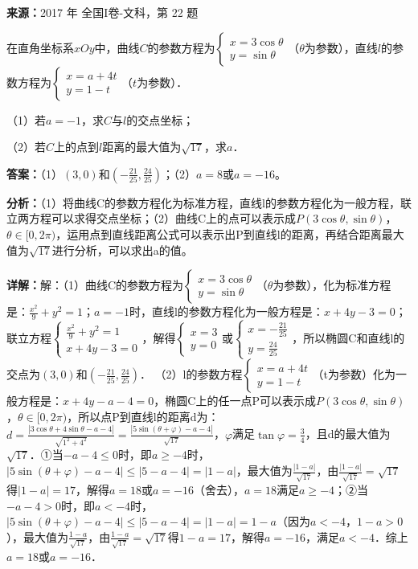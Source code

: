 \begin{question}[points=10]
\textbf{来源：}2017 年 全国I卷-文科，第 22 题\par
在直角坐标系$xOy$中，曲线$C$的参数方程为$\begin{cases} x=3\cos\theta \\ y=\sin\theta \end{cases}$（$\theta$为参数），直线$l$的参数方程为$\begin{cases} x=a+4t \\ y=1-t \end{cases}$（$t$为参数）．

（1）若$a=-1$，求$C$与$l$的交点坐标；

（2）若$C$上的点到$l$距离的最大值为$\sqrt{17}$，求$a$．
\begin{solution}
\textbf{答案：}（1）$(3,0)$和$(-\frac{21}{25},\frac{24}{25})$；（2）$a=8$或$a=-16$。

\textbf{分析：}（1）将曲线C的参数方程化为标准方程，直线l的参数方程化为一般方程，联立两方程可以求得交点坐标；（2）曲线C上的点可以表示成$P(3\cos\theta,\sin\theta)$，$\theta\in[0,2\pi)$，运用点到直线距离公式可以表示出P到直线l的距离，再结合距离最大值为$\sqrt{17}$进行分析，可以求出a的值。

\textbf{详解：}解：（1）曲线C的参数方程为$\begin{cases} x=3\cos\theta \\ y=\sin\theta \end{cases}$（$\theta$为参数），化为标准方程是：$\frac{x^2}{9}+y^2=1$；$a=-1$时，直线l的参数方程化为一般方程是：$x+4y-3=0$；联立方程$\begin{cases} \frac{x^2}{9}+y^2=1 \\ x+4y-3=0 \end{cases}$，解得$\begin{cases} x=3 \\ y=0 \end{cases}$或$\begin{cases} x=-\frac{21}{25} \\ y=\frac{24}{25} \end{cases}$，所以椭圆C和直线l的交点为$(3,0)$和$(-\frac{21}{25},\frac{24}{25})$．
（2）l的参数方程$\begin{cases} x=a+4t \\ y=1-t \end{cases}$（t为参数）化为一般方程是：$x+4y-a-4=0$，椭圆C上的任一点P可以表示成$P(3\cos\theta,\sin\theta)$，$\theta\in[0,2\pi)$，所以点P到直线l的距离d为：$d=\frac{|3\cos\theta+4\sin\theta-a-4|}{\sqrt{1^2+4^2}}=\frac{|5\sin(\theta+\varphi)-a-4|}{\sqrt{17}}$，$\varphi$满足$\tan\varphi=\frac{3}{4}$，且d的最大值为$\sqrt{17}$．①当$-a-4\le0$时，即$a\ge-4$时，$|5\sin(\theta+\varphi)-a-4|\le|5-a-4|=|1-a|$，最大值为$\frac{|1-a|}{\sqrt{17}}$，由$\frac{|1-a|}{\sqrt{17}}=\sqrt{17}$得$|1-a|=17$，解得$a=18$或$a=-16$（舍去），$a=18$满足$a\ge-4$；②当$-a-4>0$时，即$a<-4$时，$|5\sin(\theta+\varphi)-a-4|\le|5-a-4|=|1-a|=1-a$（因为$a<-4$，$1-a>0$），最大值为$\frac{1-a}{\sqrt{17}}$，由$\frac{1-a}{\sqrt{17}}=\sqrt{17}$得$1-a=17$，解得$a=-16$，满足$a<-4$．综上$a=18$或$a=-16$．
\end{solution}
\end{question}

